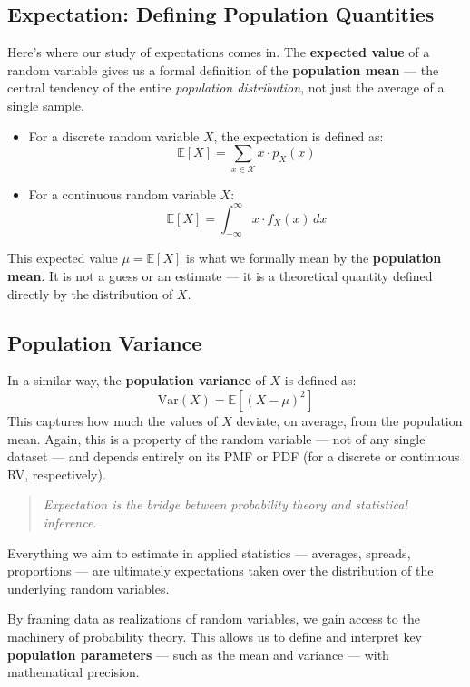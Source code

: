\documentclass[12pt]{article}
\begin{document}
\subsection*{Expectation: Defining Population Quantities}

Here’s where our study of expectations comes in. The \textbf{expected value} of a random variable gives us a formal definition of the \textbf{population mean} — the central tendency of the entire \emph{population distribution}, not just the average of a single sample.

\begin{itemize}
    \item For a discrete random variable $X$, the expectation is defined as:
    \[
    \mathbb{E}[X] = \sum_{x \in \mathcal{X}} x \cdot p_X(x)
    \]
    \item For a continuous random variable $X$:
    \[
    \mathbb{E}[X] = \int_{-\infty}^{\infty} x \cdot f_X(x) \, dx
    \]
\end{itemize}

This expected value $\mu = \mathbb{E}[X]$ is what we formally mean by the \textbf{population mean}. It is not a guess or an estimate — it is a theoretical quantity defined directly by the distribution of $X$.

\subsection*{Population Variance}

In a similar way, the \textbf{population variance} of $X$ is defined as:
\[
\mathrm{Var}(X) = \mathbb{E}[(X - \mu)^2]
\]
This captures how much the values of $X$ deviate, on average, from the population mean. Again, this is a property of the random variable — not of any single dataset — and depends entirely on its PMF or PDF (for a discrete or continuous RV, respectively).

\begin{quote}
    \textit{Expectation is the bridge between probability theory and statistical inference.}
\end{quote}

Everything we aim to estimate in applied statistics — averages, spreads, proportions — are ultimately expectations taken over the distribution of the underlying random variables. 

By framing data as realizations of random variables, we gain access to the machinery of probability theory. This allows us to define and interpret key \textbf{population parameters} — such as the mean and variance — with mathematical precision. 
\end{document}
